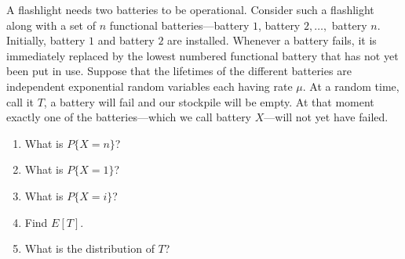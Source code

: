 \begin{exercise}
\label{ex:counting-processes-23}
A flashlight needs two batteries to be operational. Consider such a flashlight along with a set of $n$ functional batteries---battery $1$, battery $2,\ldots,$ battery $n$. Initially, battery $1$ and battery $2$ are installed. Whenever a battery fails, it is immediately replaced by the lowest numbered functional battery that has not yet been put in use. Suppose that the lifetimes of the different batteries are independent exponential random variables each having rate $\mu$. At a random time, call it $T$, a battery will fail and our stockpile will be empty. At that moment exactly one of the batteries---which we call battery $X$---will not yet have failed.
\begin{enumerate}
\item What is $P\{X=n\}$?
\item What is $P\{X=1\}$?
\item What is $P\{X=i\}$?
\item Find $E[T]$.
\item What is the distribution of $T$?
\end{enumerate}
\end{exercise}


